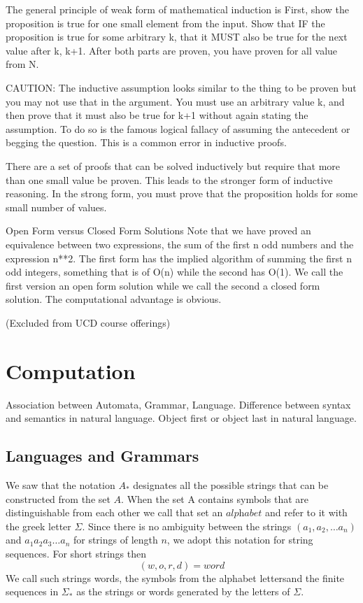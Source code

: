 \documentclass[11pt]{book} %
\theoremstyle {definition}
\theoremstyle {remark}
\begin{document}
The general principle of weak form of mathematical induction is
First, show the proposition is true for one small element from the input.
Show that IF the proposition is true for some arbitrary k, that it MUST also be true for the next value after k, k+1. 
After both parts are proven, you have proven for all value from N.

CAUTION: The inductive assumption looks similar to the thing to be proven but you may not use that in the argument. You must use an arbitrary value k, and then prove that it must also be true for k+1 without again stating the assumption. To do so is the famous logical fallacy of assuming the antecedent or begging the question. This is a common error in inductive proofs.

There are a set of proofs that can be solved inductively but require that more than one small value be proven. This leads to the stronger form of inductive reasoning. In the strong form, you must prove that the proposition holds for some small number of values.

Open Form versus Closed Form Solutions
Note that we have proved an equivalence between two expressions, the sum of the first n odd numbers and the expression n**2. The first form has the implied algorithm of summing the first n odd integers, something that is of O(n) while the second has O(1). We call the first version an open form solution while we call the second a closed form solution. The computational advantage is obvious.

\newpage




                                                                 
(Excluded from UCD course offerings)
\chapter {Computation}
Association between Automata, Grammar, Language. Difference between syntax and semantics in natural language. Object first or object last in natural language. 

\section {Languages and Grammars}
We saw that the notation $A_*$ designates all the possible strings that can be constructed from the set $A$. When the set A contains symbols that are distinguishable from each other we call that set an $\textit{alphabet}$ and refer to it with the greek letter $\Sigma$. Since there is no ambiguity between the strings $(a_1,a_2, \dots a_n)$ and $a_1a_2a_3 \dots a_n$ for strings of length $n$, we adopt this notation for string sequences. For short strings then
$$(w,o,r,d) = word$$
We call such strings words, the symbols from the alphabet lettersand the finite sequences in $\Sigma_*$ as the strings or words generated by the letters of $\Sigma$.
\end{document}
